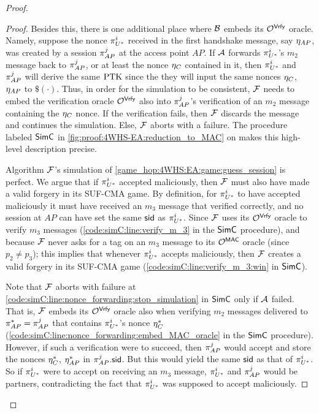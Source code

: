 \begin{proof}
\begin{proof}
Besides this,
there is one additional place where $\A[B]$ embeds its $\mathcal{O}^{\macvrfy}$ oracle.
Namely,
suppose the nonce $\eatarget$ received in the first handshake message,
say $\nonce_{AP}$, was created by a session $\oracle[AP][j]$ at the access point $AP$.
If $\A$ forwards $\eatarget$'s $m_2$ message back to $\oracle[AP][j]$,
or at least the nonce $\nonce_{C}$ contained in it,
then $\eatarget$ and $\oracle[AP][j]$ will derive the same $\PTK$
since the they will input the same nonces $\nonce_{C}$, $\nonce_{AP}$ to $\$(\cdot)$.
Thus,
in order for the simulation to be consistent,
$\A[F]$ needs to embed the verification oracle $\mathcal{O}^{\macvrfy}$ also into $\oracle[AP][j]$'s verification of an $m_2$ message containing the $\nonce_{C}$ nonce.
If the verification fails,
then $\A[F]$ discards the message and continues the simulation.
Else,
$\A[F]$ aborts with a failure.
The procedure labeled $\simC$ in \cref{fig:proof:4WHS-EA:reduction_to_MAC} on  makes this high-level description precise.





Algorithm $\A[F]$'s simulation of \cref{game_hop:4WHS:EA:game:guess_session} is perfect.
We argue that if $\eatarget$ accepted maliciously,
then $\A[F]$ must also have made a valid forgery in its SUF-CMA game.
By definition,
for $\eatarget$ to have accepted maliciously it must have received an $m_3$ message that verified correctly,
and no session at $AP$ can have set the same $\sid$ as $\eatarget$. 
Since $\A[F]$ uses its $\mathcal{O}^{\macvrfy}$ oracle to verify $m_3$ messages
(\cref{code:simC:line:verify_m_3} in the $\simC$ procedure),
and because $\A[F]$ never asks for a tag on an $m_3$ message to its $\mathcal{O}^{\mactag}$ oracle
(since $p_2 \neq p_3$);
this implies that whenever $\eatarget$ accepts maliciously,
then $\A[F]$ creates a valid forgery in its SUF-CMA game
(\cref{code:simC:line:verify_m_3:win} in $\simC$).

Note that $\A[F]$ aborts with failure at \cref{code:simC:line:nonce_forwarding:stop_simulation} in $\simC$ only if  $\A$ failed.
That is,
$\A[F]$ embeds its $\mathcal{O}^{\macvrfy}$ oracle also when verifying $m_2$ messages delivered to $\oracle[AP][*] = \oracle[AP][j]$ that contains $\eatarget$'s nonce $\nonce_{C}^*$ 
(\cref{code:simC:line:nonce_forwarding:embed_MAC_oracle} in the $\simC$ procedure).
However,
if such a verification were to succeed,
then $\oracle[AP][j]$ would accept and store the nonces $\nonce_{C}^*$, $\nonce_{AP}^*$ in $\oracle[AP][j].\sid$.
But this would yield the same $\sid$ as that of $\eatarget$.
So if $\eatarget$ were to accept on receiving an $m_3$ message,
$\eatarget$ and $\oracle[AP][j]$ would be partners,
contradicting the fact that $\eatarget$ was supposed to accept maliciously.










\end{proof}
\end{proof}
